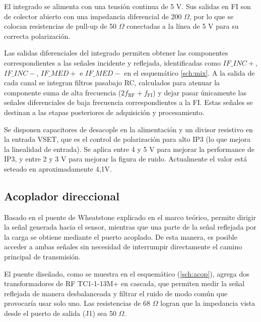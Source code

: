 El integrado se alimenta con una tensión continua de 5 V. Sus salidas en FI son de colector abierto con una impedancia diferencial de 200 $\Omega$, por lo que se colocan resistencias de pull-up de 50 $\Omega$ conectadas a la línea de 5 V para su correcta polarización. 

Las salidas diferenciales del integrado permiten obtener las componentes correspondientes a las señales incidente y reflejada, identificadas como $IF\_INC+$, $IF\_INC-$, $IF\_MED+$ e $IF\_MED-$ en el esquemático \ref{sch:mix}. A la salida de cada canal se integran filtros pasabajo RC, calculados para atenuar la componente suma de alta frecuencia ($2f_{\text{RF}} + f_{\text{FI}}$) y dejar pasar únicamente las señales diferenciales de baja frecuencia correspondientes a la FI. Estas señales se destinan a las etapas posteriores de adquisición y procesamiento.

Se disponen capacitores de desacople en la alimentación y un divisor resistivo en la entrada VSET, que es el control de polarización para alto IP3 (lo que mejora la linealidad de entrada). Se aplica entre 4 y 5 V para mejorar la performance de IP3, y entre 2 y 3 V para mejorar la figura de ruido. Actualmente el valor está seteado en aproximadamente 4,1V. 

\subsection{Acoplador direccional}
Basado en el puente de Wheatstone explicado en el marco teórico, permite dirigir la señal generada hacia el sensor, mientras que una parte de la señal reflejada por la carga se obtiene mediante el puerto acoplado. De esta manera, es posible acceder a ambas señales sin necesidad de interrumpir directamente el camino principal de transmisión.

El puente diseñado, como se muestra en el esquemático (\ref{sch:acop}), agrega dos transformadores de RF TC1-1-13M+ \cite{datasheet_tc1_1_13m} en cascada, que permiten medir la señal reflejada de manera desbalanceada y filtrar el ruido de modo común que provocaría usar solo uno. Las resistencias de 68 $\Omega$ logran que la impedancia vista desde el puerto de salida (J1) sea 50 $\Omega$.

